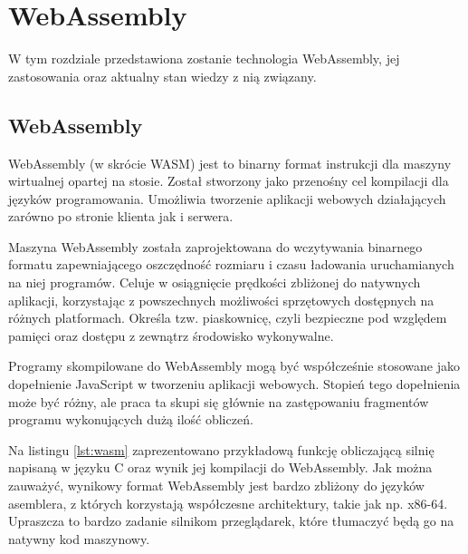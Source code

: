 \documentclass[language=polish,type=master]{aghmodern}
\begin{document}
\chapter{WebAssembly}
W tym rozdziale przedstawiona zostanie technologia WebAssembly, jej zastosowania oraz aktualny stan wiedzy z nią związany.

\section{WebAssembly}
WebAssembly (w skrócie WASM) jest to binarny format instrukcji dla maszyny wirtualnej opartej na stosie.
Został stworzony jako przenośny cel kompilacji dla języków programowania\footnotemark{}.
Umożliwia tworzenie aplikacji webowych działających zarówno po stronie klienta jak i serwera.

Maszyna WebAssembly została zaprojektowana do wczytywania binarnego formatu zapewniającego oszczędność rozmiaru i czasu ładowania uruchamianych na niej programów.
Celuje w osiągnięcie prędkości zbliżonej do natywnych aplikacji, korzystając z powszechnych możliwości sprzętowych\footnotemark{} dostępnych na różnych platformach.
Określa tzw. piaskownicę\footnotemark{}, czyli bezpieczne pod względem pamięci oraz dostępu z zewnątrz środowisko wykonywalne.

Programy skompilowane do WebAssembly mogą być współcześnie stosowane jako dopełnienie JavaScript w tworzeniu aplikacji webowych.
Stopień tego dopełnienia może być różny, ale praca ta skupi się głównie na zastępowaniu fragmentów programu wykonujących dużą ilość obliczeń.

Na listingu \ref{lst:wasm} zaprezentowano przykładową funkcję obliczającą silnię napisaną w języku C oraz wynik jej kompilacji do WebAssembly.
Jak można zauważyć, wynikowy format WebAssembly jest bardzo zbliżony do języków asemblera, z których korzystają współczesne architektury, takie jak np. x86-64.
Upraszcza to bardzo zadanie silnikom przeglądarek, które tłumaczyć będą go na natywny kod maszynowy.
\end{document}
